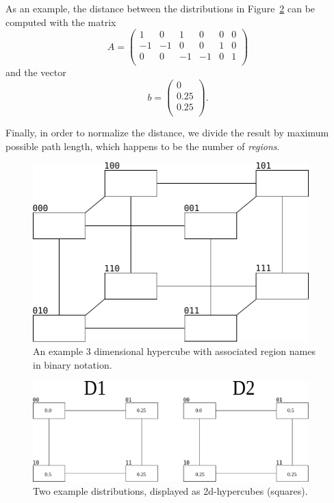 \documentclass{article}
\begin{document}
As an example, the distance between the distributions in Figure~\ref{fig:distributions-example} can be computed with the
matrix
\begin{equation*}
  A = \begin{pmatrix}
  1 & 0 & 1 & 0 & 0 & 0  \\
  -1 & -1 & 0 & 0 & 1 & 0 \\
  0 & 0 & -1 & -1 & 0 & 1\\
  \end{pmatrix}
\end{equation*}
and the vector
\begin{equation*}
b = \begin{pmatrix}
  0 \\
  0.25\\
  0.25\\
\end{pmatrix}.
\end{equation*}

Finally, in order to normalize the distance, we divide the result by maximum possible path length, which happens to be
the number of \textit{regions}.

\begin{figure}
  \begin{center}
    \includegraphics[width=0.95\textwidth]{figures/hypercube-distribution.pdf}
  \end{center}
  \caption{An example 3 dimensional hypercube with associated region names in binary notation.}
  \label{fig:hypercube}
\end{figure}

\begin{figure}
  \begin{center}
    \includegraphics[width=0.95\textwidth]{figures/example-distributions.pdf}
  \end{center}
  \caption{Two example distributions, displayed as 2d-hypercubes (squares).}
  \label{fig:distributions-example}
\end{figure}
\end{document}
